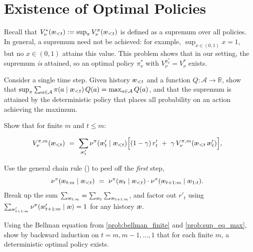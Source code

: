 \documentclass[fontsize=11pt, parskip=half]{scrartcl}
\newcommand{\cA}{\mathcal{A}}
\newcommand{\aes}{\textnormal{\ae}}
\begin{document}
\section{Existence of Optimal Policies}\label{prob:optimal_exists}

Recall that $V_\nu^*(\aes_{<t}) := \sup_\pi V_\nu^\pi(\aes_{<t})$ is defined as a supremum over all policies. In general, a supremum need not be achieved: for example, $\sup_{x \in (0,1)} x = 1$, but no $x \in (0,1)$ attains this value. This problem shows that in our setting, the supremum \emph{is} attained, so an optimal policy $\pi_\nu^*$ with $V_\nu^{\pi_\nu^*} = V_\nu^*$ exists.

\begin{exercise}
\label{prob:sup_eq_max}
Consider a single time step. Given history $\aes_{<t}$ and a function $Q : \cA \to \mathbb{R}$, show that $\sup_\pi \sum_{a \in \cA} \pi(a \mid \aes_{<t})\, Q(a) = \max_{a \in \cA} Q(a)$, and that the supremum is attained by the deterministic policy that places all probability on an action achieving the maximum.

\end{exercise}


\begin{exercise}
\label{prob:bellman_finite}
Show that for finite $m$ and $t \leq m$:

\[
    V_\nu^{\pi,m}(\aes_{<t}) ~=~ \sum_{\aes'_t} \nu^\pi(\aes'_t \mid \aes_{<t}) \Big[(1-\gamma)\, r'_t ~+~ \gamma\, V_\nu^{\pi,m}(\aes_{<t}\, \aes'_t)\Big],
\]

\begin{hint}
Use the general chain rule () to peel off the
\emph{first} step,
\[
    \nu^\pi(\aes_{t:m} \mid \aes_{<t})
    ~=~ \nu^\pi(\aes_t \mid \aes_{<t}) \cdot \nu^\pi(\aes_{t+1:m} \mid \aes_{1:t}).
\]
Break up the sum $\sum_{\aes_{t:m}} = \sum_{\aes_t} \sum_{\aes_{t+1:m}}$,
and factor out $r'_t$ using $\sum_{\aes'_{t+1:m}} \nu^\pi(\aes'_{t+1:m} \mid \aes) = 1$
for any history $\aes$.
\end{hint}
\end{exercise}


\begin{exercise}
\label{prob:backward_induction}
\skippable
Using the Bellman equation from \cref{prob:bellman_finite} and \cref{prob:sup_eq_max}, show by backward induction on $t = m, m-1, \ldots, 1$ that for each finite $m$, a deterministic optimal policy exists.

\end{exercise}
\end{document}
